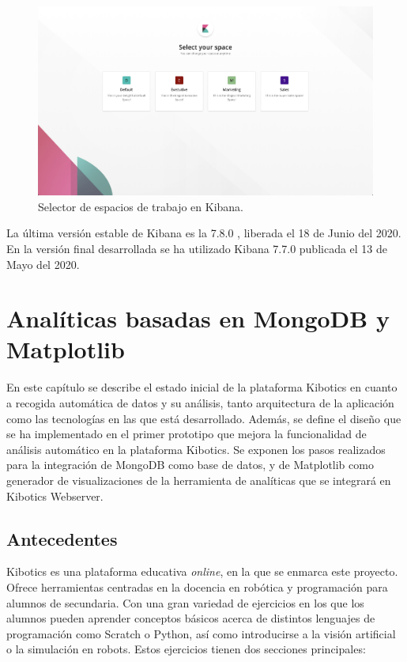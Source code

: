 \documentclass[a4paper, 12pt]{book}
\begin{document}
		
		\begin{figure}[H]
			\centering
			\includegraphics[width=12cm, keepaspectratio]{img/spaces_kibana.jpg}
			\caption{Selector de espacios de trabajo en Kibana.}
			\label{fig:spaces_kibana}
		\end{figure}
		
		La última versión estable de Kibana es la 7.8.0 \cite{versions_kibana}, liberada el 18 de Junio del 2020. En la versión final desarrollada se ha utilizado Kibana 7.7.0 publicada el 13 de Mayo del 2020.
	
	

	\cleardoublepage 
	\chapter{Analíticas basadas en MongoDB y Matplotlib} 
	\label{chap:primer_prototipo} 
		En este capítulo se describe el estado inicial de la plataforma Kibotics en cuanto a recogida automática de datos y su análisis, tanto arquitectura de la aplicación como las tecnologías en las que está desarrollado. Además, se define el diseño que se ha implementado en el primer prototipo que mejora la funcionalidad de análisis automático en la plataforma Kibotics. Se exponen los pasos realizados para la integración de MongoDB como base de datos, y de Matplotlib como generador de visualizaciones de la herramienta de analíticas que se integrará en Kibotics Webserver.
	
	
	\section{Antecedentes} 
	\label{sec:1_antecedentes} 
		Kibotics es una plataforma educativa \textit{online}, en la que se enmarca este proyecto. Ofrece herramientas centradas en la docencia en robótica y programación para alumnos de secundaria. Con una gran variedad de ejercicios en los que los alumnos pueden aprender conceptos básicos acerca de distintos lenguajes de programación como Scratch o Python, así como introducirse a la visión artificial o la simulación en robots. Estos ejercicios tienen dos secciones principales:
		
\end{document}
